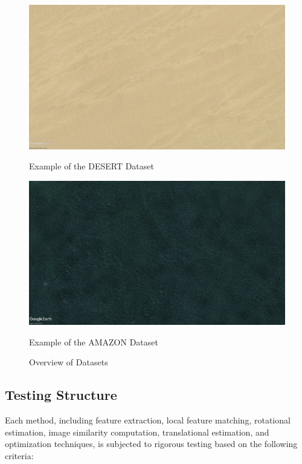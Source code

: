 \begin{figure}[H]
    \begin{minipage}{0.45\textwidth}
        \centering
        \includegraphics[width=\textwidth]{./Chapter 4/DEMODATASETS/DESERT1.jpg}
        \caption{Example of the DESERT Dataset}
        \label{fig:DESERT}
    \end{minipage}\hfill
    \begin{minipage}{0.45\textwidth}
        \centering
        \includegraphics[width=\textwidth]{./Chapter 4/DEMODATASETS/AMAZON.jpg}
        \caption{Example of the AMAZON Dataset}
        \label{fig:AMAZON}
    \end{minipage}
    
    \caption{Overview of Datasets}
    \label{fig:Datasets}
\end{figure}



\subsection{Testing Structure}

Each method, including feature extraction, local feature matching, rotational estimation, image similarity computation, translational estimation, and optimization techniques, is subjected to rigorous testing based on the following criteria:

